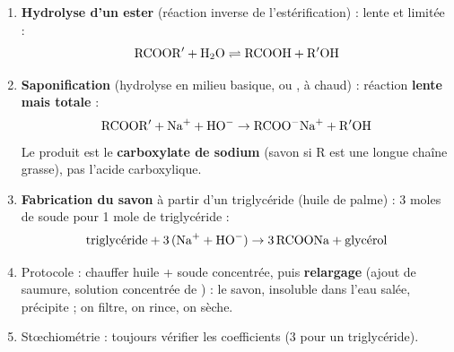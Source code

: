 \documentclass[11pt]{article}
\begin{document}
\begin{methode}
\begin{enumerate}
\item \textbf{Hydrolyse d'un ester} (réaction inverse de l'estérification) : lente et limitée :
\[ \mathrm{RCOOR'} + \ce{H2O} \rightleftharpoons \mathrm{RCOOH} + \mathrm{R'OH} \]
\item \textbf{Saponification} (hydrolyse en milieu basique,  ou , à chaud) : réaction \textbf{lente mais totale} :
\[ \mathrm{RCOOR'} + \ce{Na+} + \ce{HO-} \rightarrow \mathrm{RCOO^-}\ce{Na+} + \mathrm{R'OH} \]
Le produit est le \textbf{carboxylate de sodium} (savon si R est une longue chaîne grasse), pas l'acide carboxylique.
\item \textbf{Fabrication du savon} à partir d'un triglycéride (huile de palme) : 3 moles de soude pour 1 mole de triglycéride :
\[ \text{triglycéride} + 3\,(\ce{Na+} + \ce{HO-}) \rightarrow 3\,\mathrm{RCOONa} + \text{glycérol} \]
\item Protocole : chauffer huile + soude concentrée, puis \textbf{relargage} (ajout de saumure, solution concentrée de ) : le savon, insoluble dans l'eau salée, précipite ; on filtre, on rince, on sèche.
\item Stœchiométrie : toujours vérifier les coefficients (3 pour un triglycéride).
\end{enumerate}
\end{methode}
\end{document}
